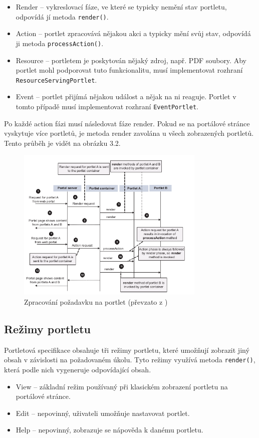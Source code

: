 \documentclass{fithesis}
\begin{document}
\begin{itemize}
\item Render -- vykreslovací fáze, ve které se typicky nemění stav portletu, odpovídá jí metoda \verb|render()|.
\item Action -- portlet zpracovává nějakou akci a typicky mění svůj stav, odpovídá ji metoda \verb|processAction()|.
\item Resource -- portletem je poskytován nějaký zdroj, např. PDF soubory. Aby portlet mohl podporovat tuto funkcionalitu, musí implementovat rozhraní \verb|ResourceServingPortlet|.
\item Event -- portlet přijímá nějakou událost a nějak na ni reaguje. Portlet v tomto případě musí implementovat rozhraní \verb|EventPortlet|.
\end{itemize}

Po každé action fázi musí následovat fáze render. Pokud se na portálové stránce vyskytuje více portletů, je metoda render zavolána u všech zobrazených portletů. Tento průběh je vidět na obrázku 3.2.

\begin{figure}[htp]
\centering
\includegraphics[width=340px]{images/process_action.png}
\caption{Zpracování požadavku na portlet (převzato z \cite{portlets-in-action})}
\end{figure}

\subsection{Režimy portletu}
Portletová specifikace obsahuje tři režimy portletu, které umožňují zobrazit jiný obsah v závislosti na požadovaném úkolu. Tyto režimy využívá metoda \verb|render()|, která podle nich vygeneruje odpovídající obsah.

\begin{itemize}
\item View -- základní režim používaný při klasickém zobrazení portletu na portálové stránce.
\item Edit -- nepovinný, uživateli umožňuje nastavovat portlet.
\item Help -- nepovinný, zobrazuje se nápověda k danému portletu.
\end{itemize}
\end{document}
